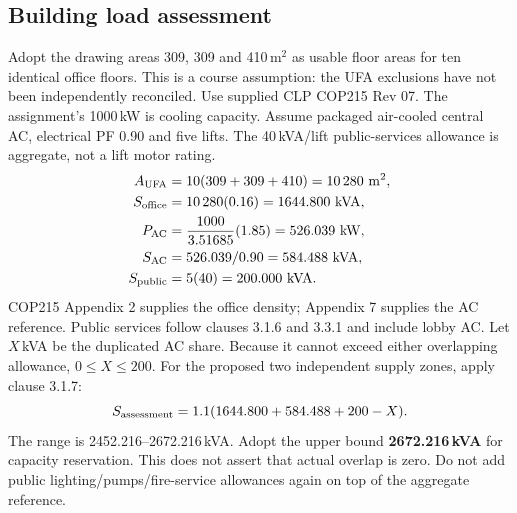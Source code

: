 \documentclass[11pt]{article}
\begin{document}
\subsection*{Building load assessment}
Adopt the drawing areas 309, 309 and 410\,m$^2$ as usable floor areas for ten identical office floors. This is a course assumption: the UFA exclusions have not been independently reconciled. Use supplied CLP COP215 Rev 07. The assignment's 1000\,kW is cooling capacity. Assume packaged air-cooled central AC, electrical PF 0.90 and five lifts. The 40\,kVA/lift public-services allowance is aggregate, not a lift motor rating.
\begin{align*}
A_{\rm UFA}&=10(309+309+410)=10\,280\ {\rm m^2},\\
S_{\rm office}&=10\,280(0.16)=1644.800\ {\rm kVA},\\
P_{\rm AC}&=\frac{1000}{3.51685}(1.85)=526.039\ {\rm kW},\\
S_{\rm AC}&=526.039/0.90=584.488\ {\rm kVA},\\
S_{\rm public}&=5(40)=200.000\ {\rm kVA}.
\end{align*}
COP215 Appendix 2 supplies the office density;  Appendix 7 supplies the AC reference. Public services follow clauses 3.1.6 and 3.3.1 and include lobby AC. Let $X$\,kVA be the duplicated AC share. Because it cannot exceed either overlapping allowance, $0\le X\le 200$. For the proposed two independent supply zones, apply clause 3.1.7:
\[
S_{\rm assessment}=1.1(1644.800+584.488+200-X).
\]
The range is 2452.216--2672.216\,kVA. Adopt the upper bound \textbf{2672.216\,kVA} for capacity reservation. This does not assert that actual overlap is zero. Do not add public lighting/pumps/fire-service allowances again on top of the aggregate reference.
\end{document}
